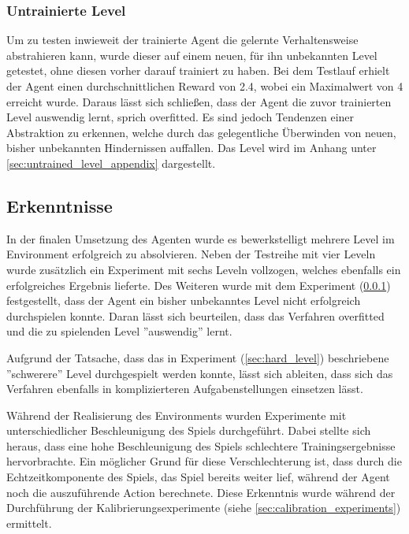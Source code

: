\documentclass[11pt]{scrartcl}
\begin{document}


\subsubsection{Untrainierte Level}
\label{sec:untrained_level}
Um zu testen inwieweit der trainierte Agent die gelernte Verhaltensweise abstrahieren
kann, wurde dieser auf einem neuen, für ihn unbekannten Level getestet, ohne diesen
vorher darauf trainiert zu haben. Bei dem Testlauf erhielt der Agent einen durchschnittlichen
Reward von 2.4, wobei ein Maximalwert von 4 erreicht wurde. Daraus lässt sich schließen,
dass der Agent die zuvor trainierten Level auswendig lernt, sprich overfitted. Es sind
jedoch Tendenzen einer Abstraktion zu erkennen, welche durch das gelegentliche Überwinden
von neuen, bisher unbekannten Hindernissen auffallen. Das Level wird im Anhang unter \ref{sec:untrained_level_appendix} dargestellt.


\subsection{Erkenntnisse}
\label{sec:results}
In der finalen Umsetzung des Agenten wurde es bewerkstelligt mehrere Level im Environment
erfolgreich zu absolvieren. Neben der Testreihe mit vier Leveln wurde zusätzlich ein
Experiment mit sechs Leveln vollzogen, welches ebenfalls ein erfolgreiches Ergebnis
lieferte. Des Weiteren wurde mit dem Experiment (\ref{sec:untrained_level}) festgestellt,
dass der Agent ein bisher unbekanntes Level nicht erfolgreich durchspielen konnte. Daran
lässt sich beurteilen, dass das Verfahren overfitted und die zu spielenden Level ''auswendig''
lernt.

Aufgrund der Tatsache, dass das in Experiment (\ref{sec:hard_level})
beschriebene ''schwerere'' Level durchgespielt werden konnte, lässt sich ableiten, dass sich
das Verfahren ebenfalls in komplizierteren Aufgabenstellungen einsetzen lässt. %

Während der Realisierung des Environments wurden Experimente mit unterschiedlicher Beschleunigung
des Spiels durchgeführt. Dabei stellte sich heraus, dass eine hohe Beschleunigung des Spiels
schlechtere Trainingsergebnisse hervorbrachte. Ein möglicher Grund für diese Verschlechterung ist,
dass durch die Echtzeitkomponente des Spiels, das Spiel bereits weiter lief, während der Agent noch
die auszuführende Action berechnete. Diese Erkenntnis wurde während der Durchführung der
Kalibrierungsexperimente (siehe \ref{sec:calibration_experiments}) ermittelt.
\end{document}
